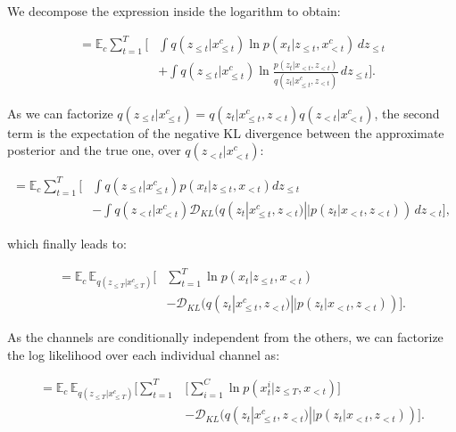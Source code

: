 We decompose the expression inside the logarithm to obtain:

\begin{equation} 
\begin{aligned}
\displaystyle
= \mathbb{E}_c \sum^T_{t=1} \Big[ & \int \mathit{q}(z_{\leq t}|x^c_{\leq t}) \ln \mathit{p}(x_t |z_{\leq t}, x^c_{< t})  \,dz_{\leq t} \\
&+ \int \mathit{q}(z_{\leq t}|x^c_{\leq t}) \ln \frac{\mathit{p}(z_t |x_{< t}, z_{< t})}{\mathit{q}(z_t |x^c_{\leq t}, z_{< t})} \,dz_{\leq t} \Big].
\end{aligned}
\end{equation}

As we can factorize $\mathit{q}(z_{\leq t}|x^c_{\leq t}) = \mathit{q}(z_t |x^c_{\leq t}, z_{< t})\mathit{q}(z_{< t}|x^c_{< t})$, the second term is the expectation of the negative KL divergence between the approximate posterior and the true one, over $\mathit{q}(z_{< t}|x^c_{< t})$:

\begin{equation} 
\begin{aligned}
\displaystyle
= \mathbb{E}_c \sum^T_{t=1} \Big[  & \int \mathit{q}(z_{\leq t}|x^c_{\leq t}) \mathit{p}(x_t |z_{\leq t}, x_{< t}) dz_{\leq t} \\
&- \int \mathit{q}(z_{< t}|x^c_{< t}) \mathcal{D}_{KL}(\mathit{q}(z_t |x^c_{\leq t}, z_{< t}) || \mathit{p}(z_t |x_{< t}, z_{< t})) \,dz_{< t} \Big],
\end{aligned}
\end{equation}

which finally leads to:

\begin{equation} 
\begin{aligned}
\displaystyle
= \mathbb{E}_c \,\mathbb{E}_{\mathit{q}(z_{\leq T}|x^c_{\leq T})}  \Big[ & \sum^T_{t=1} \ln \mathit{p}(x_t |z_{\leq t}, x_{< t}) \\
&- \mathcal{D}_{KL}(\mathit{q}(z_t |x^c_{\leq t}, z_{< t}) || \mathit{p}(z_t |x_{< t}, z_{< t})) \Big].
\end{aligned}
\end{equation}

As the channels are conditionally independent from the others, we can factorize the log likelihood over each individual channel as:

\begin{equation} 
\begin{aligned} \label{rnn:eq:finalopt}
\displaystyle
= \mathbb{E}_c \,\mathbb{E}_{\mathit{q}(z_{\leq T}|x^c_{\leq T})} \Big[ \sum^T_{t=1} & \Big[ \sum^C_{i=1} \ln \mathit{p}(x^i_t |z_{\leq T}, x_{< t}) \Big] \\
&- \mathcal{D}_{KL}( \mathit{q}(z_t |x^c_{\leq t}, z_{< t}) || \mathit{p}(z_t |x_{< t}, z_{< t})) \Big].
\end{aligned}
\end{equation}


